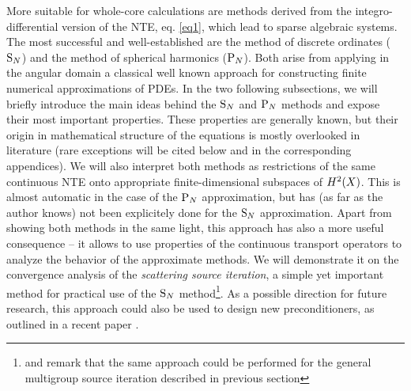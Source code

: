 \vspace*{1em}
More suitable for whole-core calculations are methods derived from the integro-differential
version of the NTE, eq.
\eqref{eq1}, which lead to sparse algebraic systems. The most successful and well-established are the method
of discrete ordinates ($\SN$) and the method of spherical harmonics ($\PN$).
Both arise from applying in the
angular domain a classical well known approach for constructing finite numerical
approximations of PDEs.  In the two following
subsections, we will briefly introduce the main ideas behind the $\SN$ and $\PN$ methods and expose their most important
properties. These properties are generally known, but their origin in mathematical structure of the equations is mostly 
overlooked in literature (rare exceptions will be cited below and in the corresponding appendices). We will also
interpret both methods as restrictions of the same continuous NTE onto appropriate finite-dimensional subspaces of
$\Hp[2](X)$. This is almost automatic in the case of the $\PN$ approximation, but has (as far as the author knows) not
been explicitely done for the $\SN$ approximation. Apart from showing both methods in the same light, this approach has
also a more useful consequence -- it allows to use properties of the continuous transport operators to analyze the
behavior of the approximate methods. We will demonstrate it on the convergence analysis of the \textit{scattering
source iteration}, a simple yet important method for practical use of the $\SN$ method\footnote{and remark that the same
approach could be performed for the general multigroup source iteration described in previous section}. As a
possible direction for future research, this approach could also be used to design new preconditioners, as outlined in a
recent paper \cite{Kirby}.

